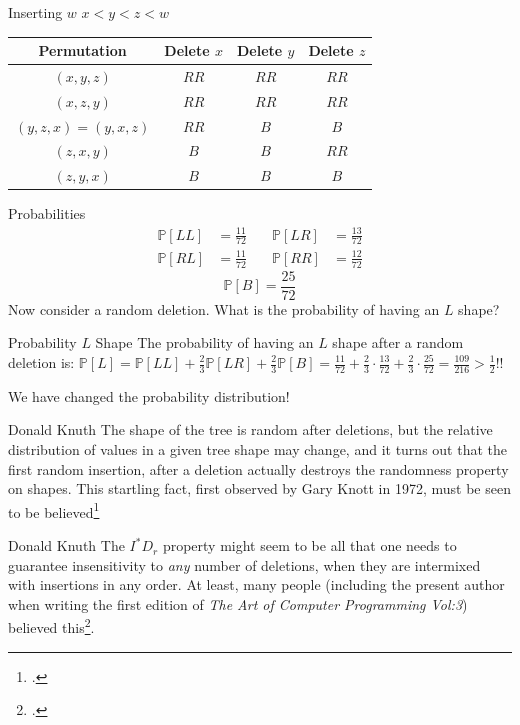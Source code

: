 \documentclass{beamer}
\begin{document}
\begin{frame}{Inserting $w$}
    $x < y < z < w$
    \begin{center}
        \begin{tabular}{||c c c c||} 
            \hline
            Permutation& Delete $x$& Delete $y$ & Delete $z$ \\ [0.5ex] 
            \hline\hline
            $(x,y,z)$ & $RR$ & $RR$ & $RR$ \\ 
            \hline
            $(x,z,y)$ & $RR$ & $RR$ & $RR$ \\  
            \hline
            $(y,z,x) = (y,x,z)$ & $RR$ & $B$ & $B$\\ 
            \hline
            $(z,x,y)$ & $B$ & $B$ & $RR$\\ 
            \hline
            $(z,y,x)$ & $B$ & $B$ & $B$ \\ 
            \hline
        \end{tabular}
    \end{center}
\end{frame}

\begin{frame}{Probabilities}
    \begin{align*}
        \mathbb{P}[LL] &= \frac{11}{72} & \quad \mathbb{P}[LR] &= \frac{13}{72} \\
        \mathbb{P}[RL] &= \frac{11}{72} & \quad \mathbb{P}[RR] &= \frac{12}{72}
    \end{align*}
        $$
        \mathbb{P}[B] = \frac{25}{72}
        $$
        Now consider a random deletion. What is the probability of having an $L$ shape?
    \pause
    \begin{block}{Probability $L$ Shape}
        The probability of having an $L$ shape after a random deletion is: $\mathbb{P}[L] = \mathbb{P}[LL] + \frac{2}{3}  \mathbb{P}[LR] + \frac{2}{3} \mathbb{P}[B] = \frac{11}{72} + \frac{2}{3} \cdot \frac{13}{72} + \frac{2}{3} \cdot \frac{25}{72} = \frac{109}{216} > \frac{1}{2}$!!
    \end{block}
    We have changed the probability distribution!
\end{frame}

\begin{frame}
    \begin{block}{Donald Knuth}
        The shape of the tree is random after deletions, but the relative distribution of values in a given tree shape may change, and it turns out that the first random insertion, after a deletion actually destroys the randomness property on shapes. This startling fact, first observed by Gary Knott in 1972, must be seen to be believed\footcite{knuth1998art}
    \end{block}
    \begin{block}{Donald Knuth}
        The $I^*D_r$ property might seem to be all that one needs to guarantee insensitivity to \textit{any} number of deletions, when they are intermixed with insertions in any order. At least, many people (including the present author when writing the first edition of \textit{The Art of Computer Programming Vol:3}) believed this\footcite{knuth1977deletions}.
    \end{block}
\end{frame}
\end{document}
